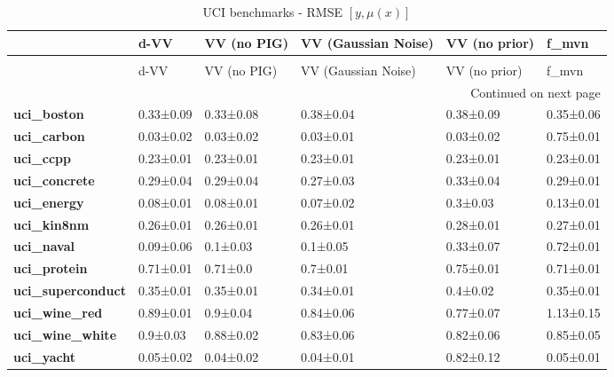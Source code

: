 \begin{longtable}[l]{llllll}
\caption{UCI benchmarks - RMSE $[y, \mu(x)]$}\\
\toprule
{} &       d-VV & VV (no PIG) & VV (Gaussian Noise) & VV (no prior) &      f\_mvn \\
\midrule
\endfirsthead
\caption[]{UCI benchmarks - RMSE $[y, \mu(x)]$} \\
\toprule
{} &       d-VV & VV (no PIG) & VV (Gaussian Noise) & VV (no prior) &      f\_mvn \\
\midrule
\endhead
\midrule
\multicolumn{6}{r}{{Continued on next page}} \\
\midrule
\endfoot

\bottomrule
\endlastfoot
\textbf{uci\_boston      } &  0.33±0.09 &   0.33±0.08 &           0.38±0.04 &     0.38±0.09 &  0.35±0.06 \\
\textbf{uci\_carbon      } &  0.03±0.02 &   0.03±0.02 &           0.03±0.01 &     0.03±0.02 &  0.75±0.01 \\
\textbf{uci\_ccpp        } &  0.23±0.01 &   0.23±0.01 &           0.23±0.01 &     0.23±0.01 &  0.23±0.01 \\
\textbf{uci\_concrete    } &  0.29±0.04 &   0.29±0.04 &           0.27±0.03 &     0.33±0.04 &  0.29±0.01 \\
\textbf{uci\_energy      } &  0.08±0.01 &   0.08±0.01 &           0.07±0.02 &      0.3±0.03 &  0.13±0.01 \\
\textbf{uci\_kin8nm      } &  0.26±0.01 &   0.26±0.01 &           0.26±0.01 &     0.28±0.01 &  0.27±0.01 \\
\textbf{uci\_naval       } &  0.09±0.06 &    0.1±0.03 &            0.1±0.05 &     0.33±0.07 &  0.72±0.01 \\
\textbf{uci\_protein     } &  0.71±0.01 &    0.71±0.0 &            0.7±0.01 &     0.75±0.01 &  0.71±0.01 \\
\textbf{uci\_superconduct} &  0.35±0.01 &   0.35±0.01 &           0.34±0.01 &      0.4±0.02 &  0.35±0.01 \\
\textbf{uci\_wine\_red    } &  0.89±0.01 &    0.9±0.04 &           0.84±0.06 &     0.77±0.07 &  1.13±0.15 \\
\textbf{uci\_wine\_white  } &   0.9±0.03 &   0.88±0.02 &           0.83±0.06 &     0.82±0.06 &  0.85±0.05 \\
\textbf{uci\_yacht       } &  0.05±0.02 &   0.04±0.02 &           0.04±0.01 &     0.82±0.12 &  0.05±0.01 \\
\end{longtable}
\addtocounter{table}{-1}
